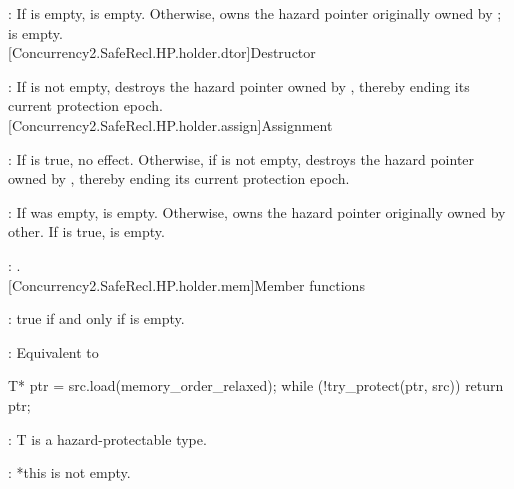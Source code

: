 
\pnum
{}: If  is empty,  is empty. Otherwise,  owns the hazard pointer originally owned by ;  is empty.
\\

[Concurrency2.SafeRecl.HP.holder.dtor]{Destructor}


\pnum
{}: If  is not empty, destroys the hazard pointer owned by , thereby ending its current protection epoch.
\\

[Concurrency2.SafeRecl.HP.holder.assign]{Assignment}


\pnum
{}: If  is true, no effect. Otherwise, if  is not empty, destroys
the hazard pointer owned by , thereby ending its current protection epoch.

\pnum
{}: If  was empty,  is empty. Otherwise,  owns the hazard
pointer originally owned by other. If  is true,  is empty.

\pnum
{}: .
\\

[Concurrency2.SafeRecl.HP.holder.mem]{Member functions}


\pnum
{}: true if and only if  is empty.
\\


\pnum
{}: Equivalent to
\begin{codeblock}
T* ptr = src.load(memory_order_relaxed);
while (!try_protect(ptr, src)) {}
return ptr;
\end{codeblock}


\pnum
{}: T is a hazard-protectable type.

\pnum
{}: *this is not empty.

